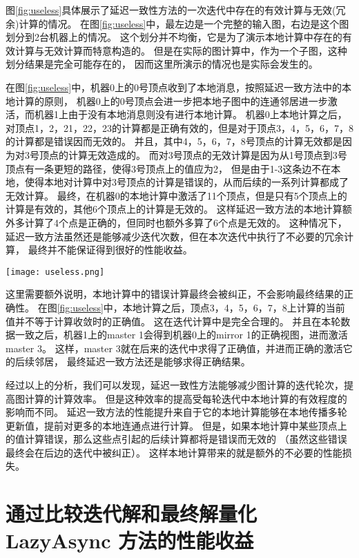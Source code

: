 图\ref{fig:useless}具体展示了延迟一致性方法的一次迭代中存在的有效计算与无效(冗余)计算的情况。
在图\ref{fig:useless}中，最左边是一个完整的输入图，右边是这个图划分到2台机器上的情况。
这个划分并不均衡，它是为了演示本地计算中存在的有效计算与无效计算而特意构造的。
但是在实际的图计算中，作为一个子图，这种划分结果是完全可能存在的，
因而这里所演示的情况也是实际会发生的。

在图\ref{fig:useless}中，机器0上的0号顶点收到了本地消息，按照延迟一致方法中的本地计算的原则，
机器0上的0号顶点会进一步把本地子图中的连通邻居进一步激活，而机器1上由于没有本地消息则没有进行本地计算。
机器0上本地计算之后，对顶点1，2，21，22，23的计算都是正确有效的，但是对于顶点3，4，5，6，7，8的计算都是错误因而无效的。
并且，其中4，5，6，7，8号顶点的计算无效都是因为对3号顶点的计算无效造成的。
而对3号顶点的无效计算是因为从1号顶点到3号顶点有一条更短的路径，使得3号顶点上的值应为2，
但是由于1-3这条边不在本地，使得本地对计算中对3号顶点的计算是错误的，从而后续的一系列计算都成了无效计算。
最终，在机器0的本地计算中激活了11个顶点，但是只有5个顶点上的计算是有效的，其他6个顶点上的计算是无效的。
这样延迟一致方法的本地计算额外多计算了4个点是正确的，但同时也额外多算了6个点是无效的。
这种情况下，延迟一致方法虽然还是能够减少迭代次数，但在本次迭代中执行了不必要的冗余计算，
最终并不能保证得到很好的性能收益。

\begin{center}
  \texttt{[image: useless.png]}
  \label{fig:useless}
\end{center}  

这里需要额外说明，本地计算中的错误计算最终会被纠正，不会影响最终结果的正确性。
在图\ref{fig:useless}中，本地计算之后，顶点3，4，5，6，7，8上计算的当前值并不等于计算收敛时的正确值。
这在迭代计算中是完全合理的。
并且在本轮数据一致之后，机器1上的master 1会得到机器0上的mirror 1的正确视图，进而激活master 3。
这样，master 3就在后来的迭代中求得了正确值，并进而正确的激活它的后续邻居，
最终延迟一致方法还是能够求得正确结果。

经过以上的分析，我们可以发现，延迟一致性方法能够减少图计算的迭代轮次，提高图计算的计算效率。
但是这种效率的提高受每轮迭代中本地计算的有效程度的影响而不同。
延迟一致方法的性能提升来自于它的本地计算能够在本地传播多轮更新值，提前对更多的本地连通点进行计算。
但是，如果本地计算中某些顶点上的值计算错误，那么这些点引起的后续计算都将是错误而无效的
（虽然这些错误最终会在后边的迭代中被纠正）。
这样本地计算带来的就是额外的不必要的性能损失。


\section{通过比较迭代解和最终解量化LazyAsync 方法的性能收益}  


